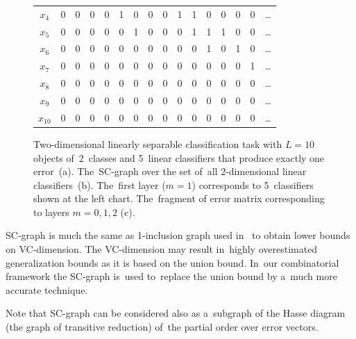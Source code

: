\documentclass{article}
\let\cite\citep
\begin{document}
\begin{figure}[t]
\begin{tabular}{c|c|ccccc|cccccccc|c}
        $x_4$ & 0 & 0 & 0 & 0 & 1 & 0 & 0 & 0 & 1 & 1 & 0 & 0 & 0 & 0 & \ldots \\[-0.6ex]
        $x_5$ & 0 & 0 & 0 & 0 & 0 & 1 & 0 & 0 & 0 & 1 & 1 & 1 & 0 & 0 & \ldots \\[-0.6ex]
        $x_6$ & 0 & 0 & 0 & 0 & 0 & 0 & 0 & 0 & 0 & 0 & 1 & 0 & 1 & 0 & \ldots \\[-0.6ex]
        $x_7$ & 0 & 0 & 0 & 0 & 0 & 0 & 0 & 0 & 0 & 0 & 0 & 0 & 0 & 1 & \ldots \\[-0.6ex]
        $x_8$ & 0 & 0 & 0 & 0 & 0 & 0 & 0 & 0 & 0 & 0 & 0 & 0 & 0 & 0 & \ldots \\[-0.6ex]
        $x_9$ & 0 & 0 & 0 & 0 & 0 & 0 & 0 & 0 & 0 & 0 & 0 & 0 & 0 & 0 & \ldots \\[-0.6ex]
     $x_{10}$ & 0 & 0 & 0 & 0 & 0 & 0 & 0 & 0 & 0 & 0 & 0 & 0 & 0 & 0 & \ldots
    \end{tabular}
    \caption{%
        Two-dimensional linearly separable classification task with ${L=10}$ objects of~2~classes
        and 5~linear classifiers that produce exactly one error~(a).
        The~SC-graph over the set of~all \mbox{2-dimensional} linear classifiers~(b).
        The~first layer (${m=1}$) corresponds to 5~classifiers shown at the left chart.
        The~fragment of error matrix corresponding to layers $m=0,1,2$ (c).
    }
    \label{fig:SC-graph-lin}
\end{figure}

SC-graph is much the same as 1-inclusion graph
used in~\cite{haussler94predicting} to obtain lower bounds on VC-dimension.
The VC-dimension may result in~highly overestimated generalization bounds as it is based on the union bound.
In~our combinatorial framework
the SC-graph is~used to~replace the union bound by a~much more accurate technique.

Note that SC-graph can be considered also
as a~subgraph of the Hasse diagram (the graph of transitive reduction)
of~the partial order over error vectors.
\end{document}
